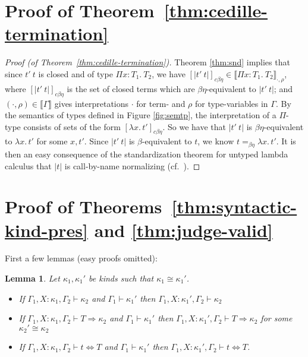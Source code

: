 \documentclass{article}
\newcommand{\interp}[1]{\llbracket #1 \rrbracket}
\newcommand{\tpsynth}[0]{\Rightarrow}
\newtheorem{lemma}[theorem]{Lemma}
\begin{document}
\section{Proof of Theorem~\ref{thm:cedille-termination}}
\begin{proof}[Proof (of Theorem~\ref{thm:cedille-termination})]
Theorem \ref{thm:snd} implies that since
$t'\ t$ is closed and of type $\Pi x:T_1.\ T_2$, we have
$[|t'\ t|]_{c\beta\eta}\in \interp{\Pi x:T_1.\ T_2}_{\cdot,\rho}$,
where $[|t'\ t|]_{c\beta\eta}$ is the set of closed terms which are
$\beta\eta$-equivalent to $|t'\ t|$; and
$(\cdot,\rho)\in\interp{\Gamma}$ gives interpretations $\cdot$ for
term- and $\rho$ for type-variables in $\Gamma$.  By the semantics of
types defined in Figure \ref{fig:semtp}, the
interpretation of a $\Pi$-type consists of sets of the form
$[\lambda x.\,t']_{c\beta\eta}$.  So we have that $|t'\ t|$ is $\beta\eta$-equivalent to
$\lambda x.\, t'$ for some $x, t'$.  
Since $|t'\ t|$ is $\beta$-equivalent to $t$, we know $t =_{\beta\eta} \lambda x.\, t'$.
It is then an easy consequence of the
standardization theorem for untyped lambda calculus that $|t|$ is
call-by-name normalizing (cf.~\cite{Kashima2000}).
\end{proof}

\section{Proof of Theorems~\ref{thm:syntactic-kind-pres} and \ref{thm:judge-valid}}
\label{sec:proof-syntactic-kind-pres}

First a few lemmas (easy proofs omitted):

\begin{lemma}
  \label{lem:ctxt-conv-class}
  Let \(\kappa_1,\kappa_1'\) be kinds such that \(\kappa_1 \cong \kappa_1'\).
  \begin{itemize}
  \item If \(\Gamma_1,X:\kappa_1,\Gamma_2 \vdash \kappa_2\) and \(\Gamma_1
    \vdash \kappa_1'\) then \(\Gamma_1,X:\kappa_1',\Gamma_2 \vdash \kappa_2\)
   
  \item If \(\Gamma_1,X:\kappa_1,\Gamma_2 \vdash T \tpsynth \kappa_2\) and
    \(\Gamma_1 \vdash \kappa_1'\) then \(\Gamma_1,X:\kappa_1',\Gamma_2 \vdash T
    \tpsynth \kappa_2\) for some \(\kappa_2' \cong \kappa_2\)

    
  \item If \(\Gamma_1,X:\kappa_1,\Gamma_2 \vdash t \Leftrightarrow T\) and
    \(\Gamma_1 \vdash \kappa_1'\) then \(\Gamma_1,X:\kappa_1',\Gamma_2 \vdash t
    \Leftrightarrow T\).
  \end{itemize}
\end{lemma}
\end{document}
